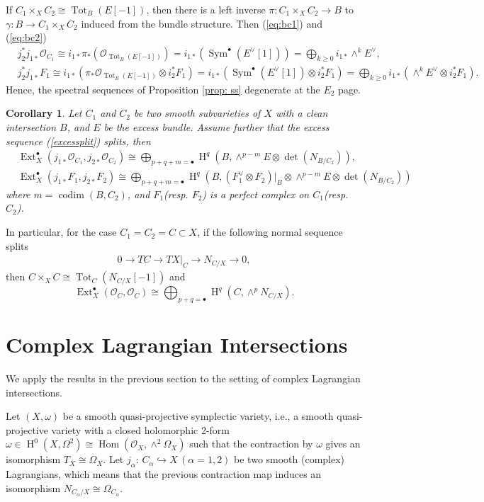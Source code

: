 \documentclass[12pt]{amsart}
\newtheorem{corollary}[theorem]{Corollary}
\theoremstyle{definition}
\theoremstyle{remark}
\numberwithin{equation}{section}
\newcommand{\shO}{\mathcal{O}}
\newcommand{\codim}{\operatorname{codim}}
\newcommand{\Ext}{\operatorname{Ext}}
\newcommand{\Hom}{\operatorname{Hom}}
\newcommand{\Sym}{\operatorname{Sym}}
\newcommand{\Tot}{\operatorname{Tot}}
\newcommand{\arw}{\longrightarrow}
\newcommand{\Hdot}{\operatorname{H}}
\begin{document}
If $C_1\times_X C_2\cong \Tot_B(E[-1])$, then there is a left inverse $\pi: C_1\times_X C_2\arw B$ to $\gamma: B\arw C_1\times_X C_2$ induced from the bundle structure. Then (\ref{eq:bc1}) and (\ref{eq:bc2})
\begin{align*}
   & j_2^{*}j_{1*}\shO_{C_1}\cong i_{1*}\pi_*(\shO_{\Tot_B(E[-1])})=i_{1*}(\Sym^{\bullet} (E^{\vee}[1]))=\bigoplus_{k\geq 0}i_{1*}\wedge^k E^{\vee},\\ 
   & j_2^{*}j_{1*}F_1\cong i_{1*}(\pi_*\shO_{\Tot_B(E[-1])}\otimes i_2^*F_1)=i_{1*}(\Sym^{\bullet} (E^{\vee}[1])\otimes i_2^*F_1)=\bigoplus_{k\geq 0}i_{1*}(\wedge^k E^{\vee}\otimes i_2^*F_1).
\end{align*}
Hence, the spectral sequences of Proposition \ref{prop: ss} degenerate at the $E_2$ page. 
\begin{corollary}\label{ssd}
Let $C_1$ and $C_2$ be two smooth subvarieties of $X$ with a clean intersection $B$, and $E$ be the excess bundle. Assume further that the excess sequence (\ref{excessplit}) splits, then 
\begin{align*}
   & \Ext_X^{\bullet}(j_{1*}\shO_{C_1},j_{2*}\shO_{C_2})\cong\bigoplus_{p+q+m=\bullet}
\Hdot^q(B, \wedge^{p-m}E\otimes \det(N_{B/C_2})),\\
& \Ext_X^{\bullet}(j_{1*}F_1,j_{2*}F_2)\cong\bigoplus_{p+q+m=\bullet}
\Hdot^q(B, (F_1^{\vee}\otimes F_2)|_B\otimes \wedge^{p-m}E\otimes \det(N_{B/C_2}))
\end{align*}
where $m=\codim (B, C_2)$, and $F_1$(resp. $F_2$) is a perfect complex on $C_1$(resp. $C_2$).
\end{corollary}

In particular, for the case $C_1=C_2=C\subset X$, if the following normal sequence splits
\begin{align}\label{normalsplit}
  0\arw TC\arw TX|_C\arw N_{C/X}\arw 0,  
\end{align}
then $C\times_{X}C\cong \Tot_C(N_{C/X}[-1])$ and 
$$\Ext^{\bullet}_X(\shO_C, \shO_C)\cong \bigoplus_{p+q=\bullet}\Hdot^q(C, \wedge^p N_{C/X}).$$


\section{Complex Lagrangian Intersections}\label{sec: lagint}
We apply the results in the previous section to the setting of complex Lagrangian intersections. 

Let $(X, \omega)$ be a smooth quasi-projective symplectic variety, i.e., a smooth quasi-projective variety with a closed holomorphic 2-form $\omega\in \Hdot^0(X, \Omega^2)\cong\Hom(\shO_X, \wedge^2 \Omega_X)$ such that the contraction by $\omega$ gives an isomorphism $T_X\cong \Omega_X$. Let $j_{\alpha}:\, C_{\alpha}\hookrightarrow X\,(\alpha=1,2)$ be two smooth (complex) Lagrangians, which means that the previous contraction map induces an isomorphism $N_{C_{\alpha}/X}\cong \Omega_{C_{\alpha}}$. 
\end{document}
